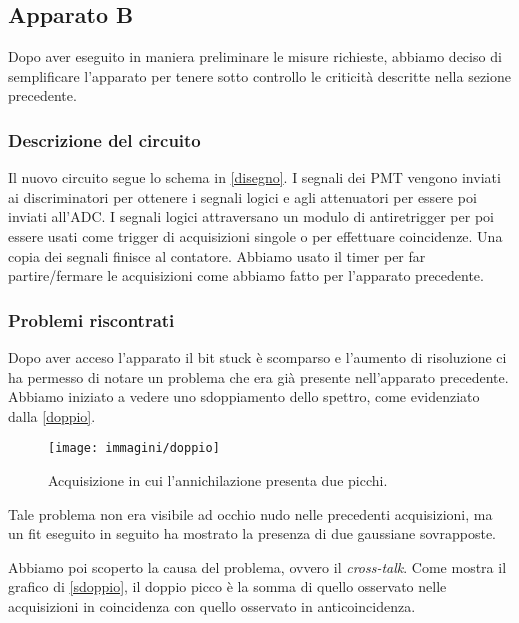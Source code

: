 \subsection{Apparato B}

Dopo aver eseguito in maniera preliminare le misure richieste, abbiamo deciso di semplificare l'apparato per tenere sotto controllo le criticità descritte nella sezione precedente.

\subsubsection{Descrizione del circuito}

Il nuovo circuito segue lo schema in \autoref{disegno}.
I segnali dei PMT vengono inviati ai discriminatori per ottenere i segnali logici e agli attenuatori per essere poi inviati all'ADC. I segnali logici attraversano un modulo di antiretrigger per poi essere usati come trigger di acquisizioni singole o per effettuare coincidenze. Una copia dei segnali finisce al contatore. Abbiamo usato il timer per far partire/fermare le acquisizioni come abbiamo fatto per l'apparato precedente.

\subsubsection{Problemi riscontrati}

Dopo aver acceso l'apparato il bit stuck è scomparso e l'aumento di risoluzione ci ha permesso di notare un problema che era già presente nell'apparato precedente. Abbiamo iniziato a vedere uno sdoppiamento dello spettro, come evidenziato dalla \autoref{doppio}. 

\begin{figure}[h]
\centering
\texttt{[image: immagini/doppio]}
\caption{Acquisizione in cui l'annichilazione presenta due picchi.}
\label{doppio}
\end{figure}

Tale problema non era visibile ad occhio nudo nelle precedenti acquisizioni, ma un fit eseguito in seguito ha mostrato la presenza di due gaussiane sovrapposte.


Abbiamo poi scoperto la causa del problema, ovvero il \emph{cross-talk}.
Come mostra il grafico di \autoref{sdoppio}, il doppio picco è la somma di quello osservato nelle acquisizioni in coincidenza con quello osservato in anticoincidenza. 

